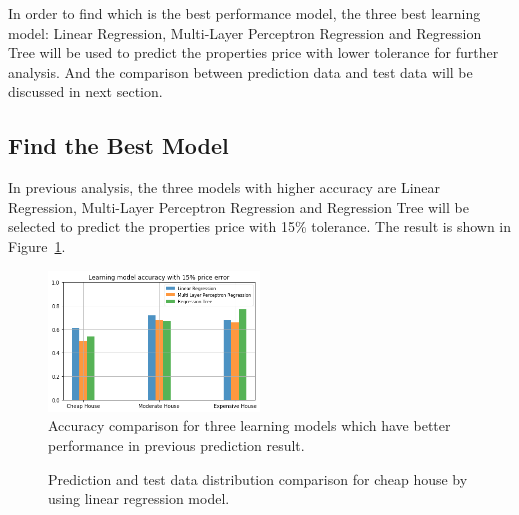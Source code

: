 \documentclass[11pt,a4paper]{article}
\begin{document}
In order to find which is the best performance model, the three best learning model: Linear Regression, Multi-Layer Perceptron Regression and Regression Tree will be used to predict the properties price with lower tolerance for further analysis. And the comparison between prediction data and test data will be discussed in next section.


\FloatBarrier
\subsection{Find the Best Model}
In previous analysis, the three models with higher accuracy are Linear Regression, Multi-Layer Perceptron Regression and Regression Tree will be selected to predict the properties price with 15\% tolerance. The result is shown in Figure~\ref{fig:tolerance15}. 
\begin{figure}[h]
\includegraphics[width=0.5\textwidth]{result-data/tolerance15.png}
\caption{Accuracy comparison for three learning models which have better performance in previous prediction result.}
\label{fig:tolerance15}
\centering
\end{figure}

\begin{figure}[h]
    \centering
    \hfill%
    \caption{Prediction and test data distribution comparison for cheap house by using linear regression model.}
    \label{fig:linearcheap}
\end{figure}
\end{document}
